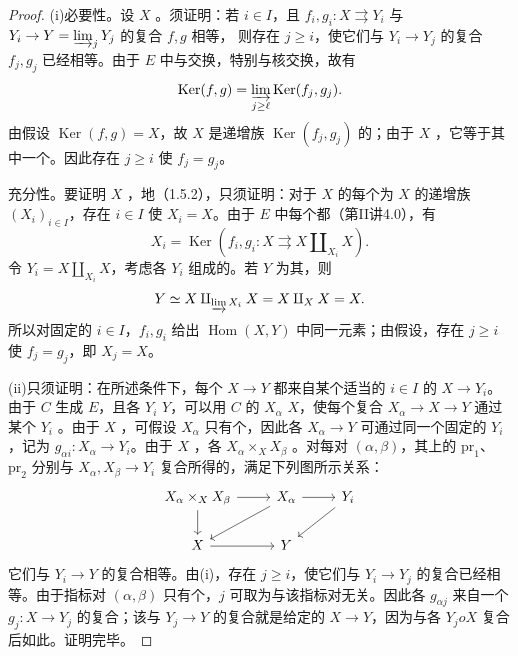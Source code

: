 \begin{proof}
(i)必要性。设 $X$ 。须证明：若 $i\in I$，且 $f_i,g_i:X\rightrightarrows Y_i$ 与 $Y_i\to Y=\varinjlim_jY_j$ 的复合 $f,g$ 相等，
则存在 $j\geq i$，使它们与 $Y_i\to Y_j$ 的复合 $f_j,g_j$ 已经相等。由于 $E$ 中与交换，特别与核交换，故有
\[
\operatorname{Ker}(f,g)=\varinjlim_{j\geq\ell}\operatorname{Ker}(f_j,g_j).
\]
由假设 $\operatorname{Ker}(f,g)=X$，故 $X$ 是递增族 $\operatorname{Ker}(f_j,g_j)$ 的；由于 $X$ ，它等于其中一个。因此存在 $j\geq i$ 使 $f_j=g_j$。

充分性。要证明 $X$ ，地（1.5.2），只须证明：对于 $X$ 的每个为 $X$ 的递增族 $(X_i)_{i\in I}$，存在 $i\in I$ 使 $X_i=X$。由于 $E$ 中每个都（第II讲4.0），有
\[
X_i=\operatorname{Ker}(f_i,g_i:X\rightrightarrows X\amalg_{X_i}X).
\]
令 $Y_i=X\amalg_{X_i}X$，考虑各 $Y_i$ 组成的。若 $Y$ 为其，则
\[
Y\simeq X\amalg_{\varinjlim X_i}X=X\amalg_X X=X.
\]
所以对固定的 $i\in I$，$f_i,g_i$ 给出 $\operatorname{Hom}(X,Y)$ 中同一元素；由假设，存在 $j\geq i$ 使 $f_j=g_j$，即 $X_j=X$。

(ii)只须证明：在所述条件下，每个 $X\to Y$ 都来自某个适当的 $i\in I$ 的 $X\to Y_i$。由于 $C$ 生成 $E$，且各 $Y_i$  $Y$，可以用 $C$ 的 $X_\alpha$  $X$，使每个复合 $X_\alpha\to X\to Y$ 通过某个 $Y_i$ 。由于 $X$ ，可假设 $X_\alpha$ 只有个，因此各 $X_\alpha\to Y$ 可通过同一个固定的 $Y_i$ ，记为 $g_{\alpha i}:X_\alpha\to Y_i$。由于 $X$ ，各 $X_\alpha\times_X X_\beta$ 。对每对 $(\alpha,\beta)$，其上的 $\mathrm{pr}_1$、$\mathrm{pr}_2$ 分别与 $X_\alpha,X_\beta\to Y_i$ 复合所得的，满足下列图所示关系：
\[
\begin{tikzcd}
X_\alpha\times_X X_\beta
\arrow[r]
\arrow[d]&X_\alpha\arrow[r]\arrow[dl]&Y_i\arrow[dl]\\
X\arrow[r]&Y&
\end{tikzcd}
\]
它们与 $Y_i\to Y$ 的复合相等。由(i)，存在 $j\geq i$，使它们与 $Y_i\to Y_j$ 的复合已经相等。由于指标对 $(\alpha,\beta)$ 只有个，$j$ 可取为与该指标对无关。因此各 $g_{\alpha j}$ 来自一个 $g_j:X\to Y_j$ 的复合；该与 $Y_j\to Y$ 的复合就是给定的 $X\to Y$，因为与各 $Y_j	o X$ 复合后如此。证明完毕。
\end{proof}
